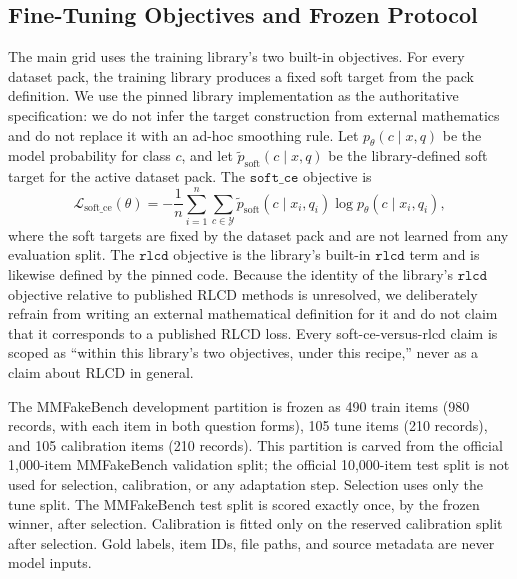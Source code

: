 \documentclass{article} %
\begin{document}
\subsection{Fine-Tuning Objectives and Frozen Protocol}
The main grid uses the training library's two built-in objectives. For every dataset pack, the training library produces a fixed soft target from the pack definition. We use the pinned library implementation as the authoritative specification: we do not infer the target construction from external mathematics and do not replace it with an ad-hoc smoothing rule. Let \(p_\theta(c\mid x,q)\) be the model probability for class \(c\), and let \(\tilde{p}_{\mathrm{soft}}(c\mid x,q)\) be the library-defined soft target for the active dataset pack. The \( \texttt{soft\_ce} \) objective is
\[
\mathcal{L}_{\mathrm{soft\_ce}}(\theta)
=
-\frac{1}{n}
\sum_{i=1}^{n}
\sum_{c\in\mathcal{Y}}
\tilde{p}_{\mathrm{soft}}(c\mid x_i,q_i)
\log p_\theta(c\mid x_i,q_i),
\]
where the soft targets are fixed by the dataset pack and are not learned from any evaluation split. The \( \texttt{rlcd} \) objective is the library's built-in \( \texttt{rlcd} \) term and is likewise defined by the pinned code. Because the identity of the library's \( \texttt{rlcd} \) objective relative to published RLCD methods is unresolved, we deliberately refrain from writing an external mathematical definition for it and do not claim that it corresponds to a published RLCD loss. Every soft-ce-versus-rlcd claim is scoped as ``within this library's two objectives, under this recipe,'' never as a claim about RLCD in general.

The MMFakeBench development partition is frozen as 490 train items (980 records, with each item in both question forms), 105 tune items (210 records), and 105 calibration items (210 records). This partition is carved from the official 1,000-item MMFakeBench validation split; the official 10,000-item test split is not used for selection, calibration, or any adaptation step. Selection uses only the tune split. The MMFakeBench test split is scored exactly once, by the frozen winner, after selection. Calibration is fitted only on the reserved calibration split after selection. Gold labels, item IDs, file paths, and source metadata are never model inputs.
\end{document}
